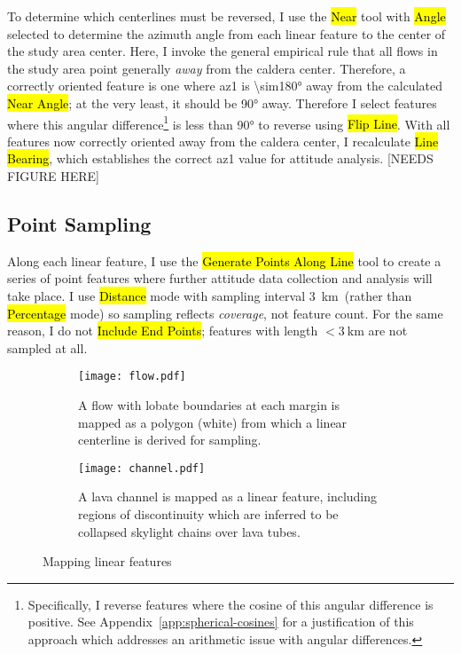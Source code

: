 To determine which centerlines must be reversed, I use the \hl{Near} tool with \hl{Angle} selected to determine the azimuth angle from each linear feature to the center of the study area \acs{center}. Here, I invoke the general empirical rule that all flows in the study area point generally \emph{away} from the caldera center. Therefore, a correctly oriented feature is one where \acs{az1} is \ang{\sim180} away from the calculated \hl{Near Angle}; at the very least, it should be \ang{90} away. Therefore I select features where this angular difference\footnote{Specifically, I reverse features where the cosine of this angular difference is positive. See Appendix~\ref{app:spherical-cosines} for a justification of this approach which addresses an arithmetic issue with angular differences.} is less than \ang{90} to reverse using \hl{Flip Line}. With all features now correctly oriented away from the caldera center, I recalculate \hl{Line Bearing}, which establishes the correct \acf{az1} value for attitude analysis. [NEEDS FIGURE HERE]

\subsection{Point Sampling}

\newcommand{\samplinginterval}{\qty{3}{\km}}

Along each linear feature, I use the \hl{Generate Points Along Line} tool to create a series of point features where further attitude data collection and analysis will take place. I use \hl{Distance} mode with sampling interval \samplinginterval\ (rather than \hl{Percentage} mode) so sampling reflects \emph{coverage}, not feature count. For the same reason, I do not \hl{Include End Points}; features with length $<\samplinginterval$ are not sampled at all.

\begin{figure}
    \centering
    \begin{subfigure}{\textwidth}
        \centering
        \texttt{[image: flow.pdf]}
        \caption[Mapped lava flow \& centerline]{A flow with lobate boundaries at each margin is mapped as a polygon (white) from which a linear centerline is derived for sampling.}
        \label{fig:flow}
    \end{subfigure}
    \begin{subfigure}{\textwidth}
        \centering
        \texttt{[image: channel.pdf]}
        \caption[Mapped lava channel]{A lava channel is mapped as a linear feature, including regions of discontinuity which are inferred to be collapsed skylight chains over lava tubes.}
        \label{fig:channel}
    \end{subfigure}
    \caption{Mapping linear features}
    \label{fig:mapping-linear}
\end{figure}

